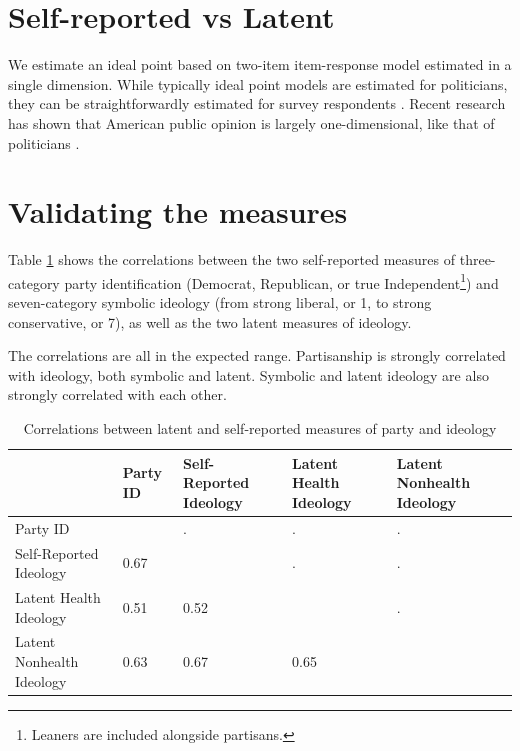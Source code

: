 \documentclass[
  oneside]{book}
\begin{document}
\hypertarget{self-reported-vs-latent}{%
\section{Self-reported vs Latent}\label{self-reported-vs-latent}}

We estimate an ideal point based on two-item item-response model \citep{Clinton:2004} estimated in a single dimension. While typically ideal point models are estimated for politicians, they can be straightforwardly estimated for survey respondents \citep{Jessee:2012}. Recent research has shown that American public opinion is largely one-dimensional, like that of politicians \citep{Fowler:2022}.

\hypertarget{validating-the-measures}{%
\section{Validating the measures}\label{validating-the-measures}}

Table \ref{tab:ideol-corr} shows the correlations between the two self-reported measures of three-category party identification (Democrat, Republican, or true Independent\footnote{Leaners are included alongside partisans.}) and seven-category symbolic ideology (from strong liberal, or 1, to strong conservative, or 7), as well as the two latent measures of ideology.

The correlations are all in the expected range. Partisanship is strongly correlated with ideology, both symbolic and latent. Symbolic and latent ideology are also strongly correlated with each other.

\begin{table}

\caption{\label{tab:ideol-corr}Correlations between latent and self-reported measures of party and ideology}
\centering
\begin{tabular}[t]{>{\raggedright\arraybackslash}p{1.5in}>{\raggedleft\arraybackslash}p{0.75in}>{\raggedleft\arraybackslash}p{0.75in}>{\raggedleft\arraybackslash}p{0.75in}>{\raggedleft\arraybackslash}p{0.75in}}
\toprule
  & Party ID & Self-Reported Ideology & Latent Health Ideology & Latent Nonhealth Ideology\\
\midrule
Party ID & 1 & . & . & .\\
Self-Reported Ideology & \num{.67} & 1 & . & .\\
Latent Health Ideology & \num{.51} & \num{.52} & 1 & .\\
Latent Nonhealth Ideology & \num{.63} & \num{.67} & \num{.65} & 1\\
\bottomrule
\end{tabular}
\end{table}
\end{document}
